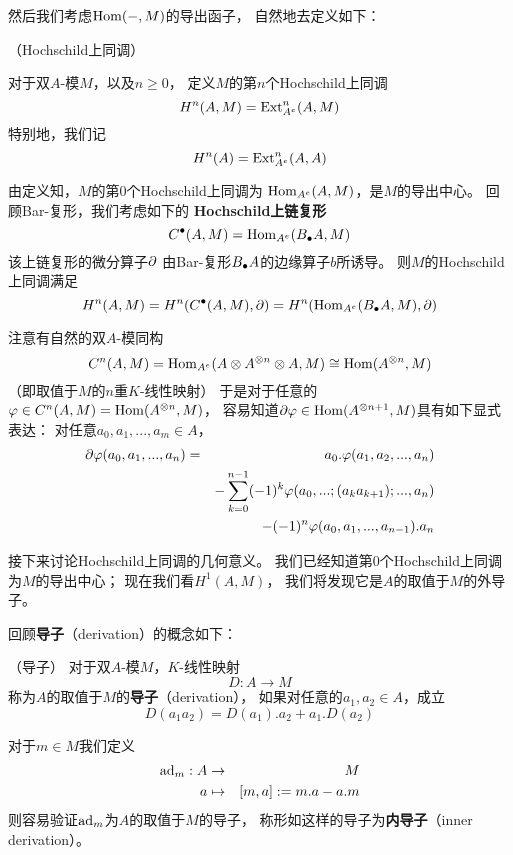 然后我们考虑$\operatorname{Hom}(-,M)$的导出函子，
自然地去定义如下：

\begin{definition}（Hochschild上同调）
\label{Hochschild上同调-def}

对于双$A$-模$M$，以及$n\geq 0$，
定义$M$的第$n$个Hochschild上同调
$$H^n(A,M)=\operatorname{Ext}_{A^e}^n(A,M)$$
特别地，我们记
$$H^n(A)=\operatorname{Ext}_{A^e}^n(A,A)$$
\end{definition}

由定义知，$M$的第$0$个Hochschild上同调为
$\operatorname{Hom}_{A^e}(A,M)$，是$M$的导出中心。
回顾Bar-复形，我们考虑如下的
\textbf{Hochschild上链复形}
$$C^{\bullet}(A,M)=\operatorname{Hom}_{A^e}(B_{\bullet} A,M)$$
该上链复形的微分算子$\partial$
由Bar-复形$B_{\bullet} A$的边缘算子$b$所诱导。
则$M$的Hochschild上同调满足
$$H^n(A,M)=H^n(C^{\bullet}(A,M),\partial)
=H^n(\operatorname{Hom}_{A^e}(B_{\bullet} A,M),\partial)$$

注意有自然的双$A$-模同构
$$C^n(A,M)
=\operatorname{Hom}_{A^e}(A\otimes A^{\otimes n}\otimes A,M)
\cong\operatorname{Hom}(A^{\otimes n},M)$$
（即取值于$M$的$n$重$K$-线性映射）
于是对于任意的$\varphi\in C^n(A,M)=\operatorname{Hom}(A^{\otimes n},M)$，
容易知道$\partial\varphi\in\operatorname{Hom}(A^{\otimes n+1},M)$具有如下显式表达：
对任意$a_0,a_1,...,a_m\in A$，
\begin{eqnarray*}
    \partial\varphi(a_0,a_1,...,a_n)
&=& a_0.\varphi(a_1,a_2,...,a_n)\\
&&- \sum_{k=0}^{n-1}(-1)^k
       \varphi(a_0,...;(a_ka_{k+1});...,a_n)\\
&&-  (-1)^n\varphi(a_0,a_1,...,a_{n-1}).a_n
\end{eqnarray*}


接下来讨论Hochschild上同调的几何意义。
我们已经知道第0个Hochschild上同调为$M$的导出中心；
现在我们看$H^1(A,M)$，
我们将发现它是$A$的取值于$M$的外导子。

回顾\textbf{导子}（derivation）的概念如下：

\begin{definition}（导子）
对于双$A$-模$M$，$K$-线性映射
$$D:A\to M$$
称为$A$的取值于$M$的\textbf{导子}（derivation），
如果对任意的$a_1,a_2\in A$，成立
$$D(a_1a_2)=D(a_1).a_2+a_1.D(a_2)$$
\end{definition}

对于$m\in M$我们定义
\begin{eqnarray*}
\operatorname{ad}_m:A&\to& M\\
a&\mapsto& [m,a]:=m.a-a.m
\end{eqnarray*}
则容易验证$\operatorname{ad}_m$为$A$的取值于$M$的导子，
称形如这样的导子为\textbf{内导子}（inner derivation）。

